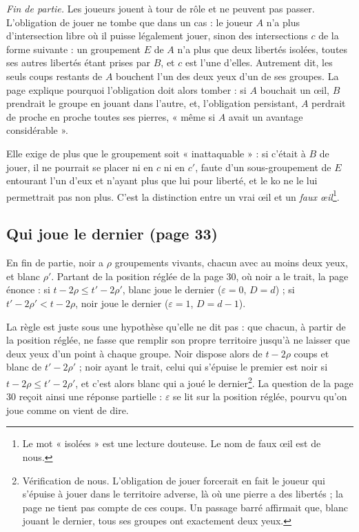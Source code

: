 \documentclass[11pt,a4paper]{article}
\begin{document}
\emph{Fin de partie.} Les joueurs jouent à tour de rôle et ne peuvent pas
passer. L'obligation de jouer ne tombe que dans un cas : le joueur $A$ n'a
plus d'intersection libre où il puisse légalement jouer, sinon des
intersections $c$ de la forme suivante : un groupement $E$ de $A$ n'a plus que
deux libertés isolées, toutes ses autres libertés étant prises par $B$, et
$c$ est l'une d'elles. Autrement dit, les seuls coups restants de $A$
bouchent l'un des deux yeux d'un de ses groupes. La page explique pourquoi
l'obligation doit alors tomber : si $A$ bouchait un œil, $B$ prendrait le
groupe en jouant dans l'autre, et, l'obligation persistant, $A$ perdrait de
proche en proche toutes ses pierres, « même si $A$ avait un avantage
considérable ».

Elle exige de plus que le groupement soit « inattaquable » : si c'était à
$B$ de jouer, il ne pourrait se placer ni en $c$ ni en $c'$, faute d'un
sous-groupement de $E$ entourant l'un d'eux et n'ayant plus que lui pour
liberté, et le ko ne le lui permettrait pas non plus. C'est la distinction
entre un vrai œil et un \emph{faux œil}\footnote{Le mot « isolées » est une
lecture douteuse. Le nom de faux œil est de nous.}.

\subsection*{Qui joue le dernier (page 33)}

En fin de partie, noir a $\rho$ groupements vivants, chacun avec au moins
deux yeux, et blanc $\rho'$. Partant de la position réglée de la page 30, où
noir a le trait, la page énonce : si $t - 2\rho \leqslant t' - 2\rho'$,
blanc joue le dernier ($\varepsilon = 0$, $D = d$) ; si
$t' - 2\rho' < t - 2\rho$, noir joue le dernier ($\varepsilon = 1$,
$D = d - 1$).

La règle est juste sous une hypothèse qu'elle ne dit pas : que chacun, à
partir de la position réglée, ne fasse que remplir son propre territoire
jusqu'à ne laisser que deux yeux d'un point à chaque groupe. Noir dispose
alors de $t - 2\rho$ coups et blanc de $t' - 2\rho'$ ; noir ayant le trait,
celui qui s'épuise le premier est noir si $t - 2\rho \leqslant t' - 2\rho'$,
et c'est alors blanc qui a joué le dernier\footnote{Vérification de nous.
L'obligation de jouer forcerait en fait le joueur qui s'épuise à jouer dans
le territoire adverse, là où une pierre a des libertés ; la page ne tient
pas compte de ces coups. Un passage barré affirmait que, blanc jouant le
dernier, tous ses groupes ont exactement deux yeux.}. La question de la page
30 reçoit ainsi une réponse partielle : $\varepsilon$ se lit sur la position
réglée, pourvu qu'on joue comme on vient de dire.
\end{document}
